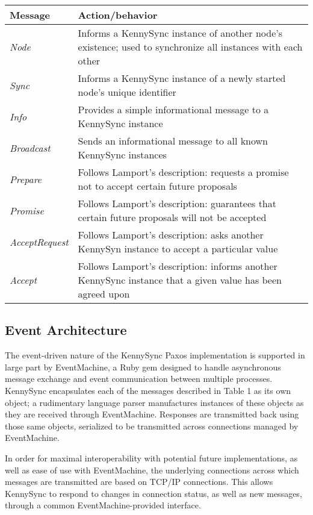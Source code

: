 \documentclass{acm_proc_article-sp}
\begin{document}
\begin{table*}
\centering
\begin{tabular}{l | l}
\textbf{Message} & \textbf{Action/behavior} \\ \hline
\textit{Node} & Informs a KennySync instance of another node's existence; used
to synchronize all instances with each other \\ \hline
\textit{Sync} & Informs a KennySync instance of a newly started node's
unique identifier \\ \hline
\textit{Info} & Provides a simple informational message to a KennySync instance
\\ \hline
\textit{Broadcast} & Sends an informational message to all known KennySync
instances \\ \hline
\textit{Prepare} & Follows Lamport's description:
requests a promise not to accept certain future proposals \\ \hline
\textit{Promise} & Follows Lamport's description:
guarantees that certain future proposals will not be accepted \\ \hline
\textit{AcceptRequest} & Follows Lamport's description: asks another KennySyn
instance to accept a particular value \\ \hline
\textit{Accept} & Follows Lamport's description: informs
another KennySync instance that a given value has been agreed upon \\ \hline
\end{tabular}
\end{table*}

\subsection{Event Architecture}

The event-driven nature of the KennySync Paxos implementation is supported in
large part by EventMachine, a Ruby gem designed to handle asynchronous message
exchange and event communication between multiple processes. KennySync
encapsulates each of the messages described in Table 1 as its own object; a
rudimentary language parser manufactures instances of these objects as they are
received through EventMachine. Responses are transmitted back using those same
objects, serialized to be transmitted across connections managed by
EventMachine.

In order for maximal interoperability with potential future implementations, as
well as ease of use with EventMachine, the underlying connections across which
messages are transmitted are based on TCP/IP connections. This allows KennySync
to respond to changes in connection status, as well as new messages, through a
common EventMachine-provided interface.
\end{document}
